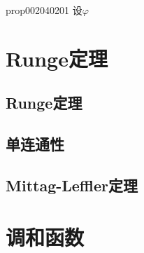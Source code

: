 \begin{proposition}{}{prop002040201}
设$\varphi$
\end{proposition}

\chapter{Runge定理}\label{chapter00208}

\section{Runge定理}\label{section0020801}


\section{单连通性}\label{section0020802}


\section{Mittag-Leffler定理}\label{section0020803}


\chapter{调和函数}\label{chapter00210}















